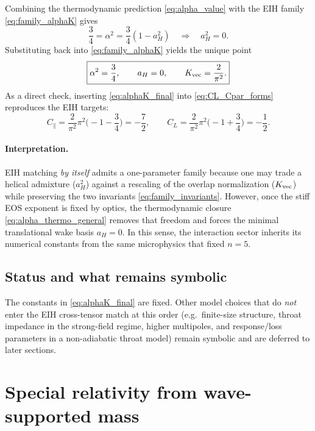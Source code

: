 \documentclass[11pt]{article}
\begin{document}
Combining the thermodynamic prediction \eqref{eq:alpha_value} with the EIH family \eqref{eq:family_alphaK} gives
\begin{equation}
  \frac{3}{4}=\alpha^2=\frac{3}{4}(1-a_H^2)\quad\Rightarrow\quad a_H^2=0.
  \label{eq:aH_zero}
\end{equation}
Substituting back into \eqref{eq:family_alphaK} yields the unique point
\begin{equation}
  \boxed{
  \alpha^2=\frac{3}{4},\qquad
  a_H=0,\qquad
  K_{\rm vec}=\frac{2}{\pi^2}.
  }
  \label{eq:alphaK_final}
\end{equation}
As a direct check, inserting \eqref{eq:alphaK_final} into \eqref{eq:CL_Cpar_forms} reproduces the EIH targets:
\begin{equation}
  C_\parallel
  =\frac{2}{\pi^2}\pi^2\Big(-1-\frac{3}{4}\Big)
  =-\frac{7}{2},
  \qquad
  C_L
  =\frac{2}{\pi^2}\pi^2\Big(-1+\frac{3}{4}\Big)
  =-\frac{1}{2}.
\end{equation}

\paragraph{Interpretation.}
EIH matching \emph{by itself} admits a one-parameter family because one may trade a helical admixture ($a_H^2$)
against a rescaling of the overlap normalization ($K_{\rm vec}$) while preserving the two invariants
\eqref{eq:family_invariants}.  However, once the stiff EOS exponent is fixed by optics, the thermodynamic closure
\eqref{eq:alpha_thermo_general} removes that freedom and forces the minimal translational wake basis $a_H=0$.
In this sense, the interaction sector inherits its numerical constants from the same microphysics that fixed $n=5$.

\subsection{Status and what remains symbolic}
\label{sec:1pn-interaction-status}

The constants in \eqref{eq:alphaK_final} are fixed.  Other model choices that do \emph{not} enter the EIH cross-tensor
match at this order (e.g.\ finite-size structure, throat impedance in the strong-field regime, higher multipoles, and
response/loss parameters in a non-adiabatic throat model) remain symbolic and are deferred to later sections.

\section{Special relativity from wave-supported mass}
\label{sec:sr_wave_mass}
\end{document}
